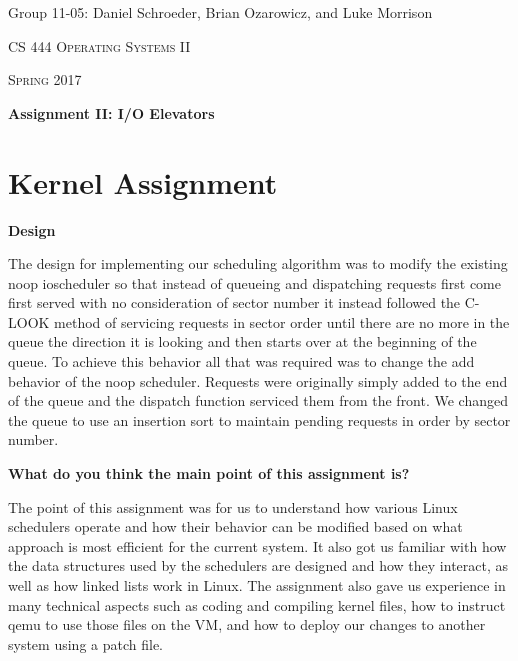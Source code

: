 \documentclass[10pt,letterpaper,draftclsnofoot,onecolumn]{IEEEtran}
\begin{document}
\begin{titlepage}
\centering
{\Large Group 11-05: Daniel Schroeder, Brian Ozarowicz, and Luke Morrison\par}
\vspace{1cm}
{\scshape\Large CS 444 Operating Systems II\par}
{\scshape\Large Spring 2017\par}
\vspace{1cm}
{\huge\bfseries Assignment II: I/O Elevators\par}
\vspace{2cm}
\begin{abstract}
This document is a summary of Assignment 2 for CS 444 Operating Systems II at Oregon State University Spring 2017. This document includes the design and implementation of the kernel assignment, responses to the reflection questions for the kernel and concurrency assignments, and a work log.
\end{abstract}
\end{titlepage}

\section{Kernel Assignment}
\bigskip

\noindent\textbf{Design}
\medskip

\medskip

\noindent The design for implementing our scheduling algorithm was to modify the existing noop ioscheduler so that instead of queueing and dispatching requests first come first served with no consideration of sector number it instead followed the C-LOOK method of servicing requests in sector order until there are no more in the queue the direction it is looking and then starts over at the beginning of the queue. To achieve this behavior all that was required was to change the add behavior of the noop scheduler. Requests were originally simply added to the end of the queue and the dispatch function serviced them from the front. We changed the queue to use an insertion sort to maintain pending requests in order by sector number.\par

\bigskip

\noindent\textbf{What do you think the main point of this assignment is?}
\medskip

\medskip

\noindent The point of this assignment was for us to understand how various Linux schedulers operate and how their behavior can be modified based on what approach is most efficient for the current system. It also got us familiar with how the data structures used by the schedulers are designed and how they interact, as well as how linked lists work in Linux. The assignment also gave us experience in many technical aspects such as coding and compiling kernel files, how to instruct qemu to use those files on the VM, and how to deploy our changes to another system using a patch file.\par
\end{document}
